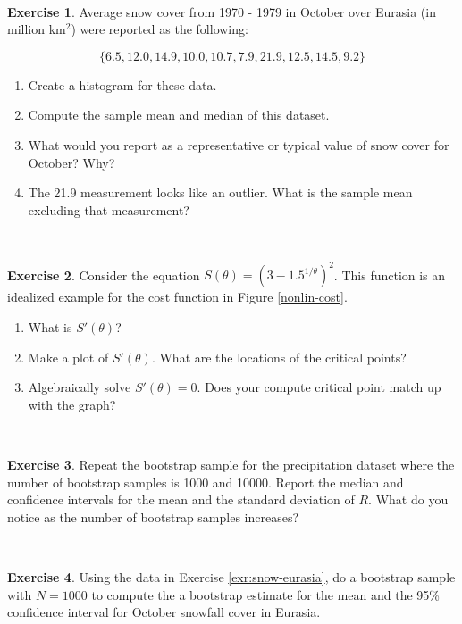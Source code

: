 \documentclass[
]{book}
\theoremstyle{definition}
\theoremstyle{definition}
\theoremstyle{definition}
\newtheorem{exercise}{Exercise}[chapter]
\theoremstyle{remark}
\begin{document}
~

\begin{exercise}
\protect\hypertarget{exr:snow-eurasia}{}{\label{exr:snow-eurasia} }Average snow cover from 1970 - 1979 in October over Eurasia (in million km\(^{2}\)) were reported as the following:

\begin{equation*}
\{6.5, 12.0, 14.9, 10.0, 10.7, 7.9, 21.9, 12.5, 14.5, 9.2\}
\end{equation*}

\begin{enumerate}[label=\alph*.]
\item Create a histogram for these data.
\item Compute the sample mean and median of this dataset.
\item What would you report as a representative or typical value of snow cover for October?  Why?
\item The 21.9 measurement looks like an outlier.  What is the sample mean excluding that measurement?
\end{enumerate}
\end{exercise}

~

\begin{exercise}
\protect\hypertarget{exr:unnamed-chunk-196}{}{\label{exr:unnamed-chunk-196} }Consider the equation \(\displaystyle S(\theta)=(3-1.5^{1/\theta})^{2}\). This function is an idealized example for the cost function in Figure \ref{nonlin-cost}.

\begin{enumerate}[label=\alph*.]
\item What is $S'(\theta)$?
\item Make a plot of $S'(\theta)$.  What are the locations of the critical points?
\item Algebraically solve $S'(\theta)=0$.  Does your compute critical point match up with the graph?
\end{enumerate}
\end{exercise}

~
\begin{exercise}
\protect\hypertarget{exr:unnamed-chunk-197}{}{\label{exr:unnamed-chunk-197} }Repeat the bootstrap sample for the precipitation dataset where the number of bootstrap samples is 1000 and 10000. Report the median and confidence intervals for the mean and the standard deviation of \(R\). What do you notice as the number of bootstrap samples increases?
\end{exercise}
~
\begin{exercise}
\protect\hypertarget{exr:unnamed-chunk-198}{}{\label{exr:unnamed-chunk-198} }Using the data in Exercise \ref{exr:snow-eurasia}, do a bootstrap sample with \(N=1000\) to compute the a bootstrap estimate for the mean and the 95\% confidence interval for October snowfall cover in Eurasia.
\end{exercise}
~
\end{document}
